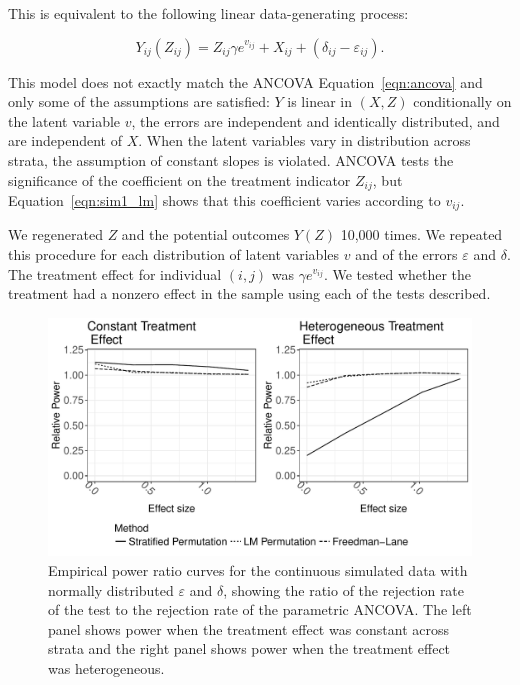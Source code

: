 \documentclass[12pt]{article}
\begin{document}
\noindent This is equivalent to the following linear data-generating process:

\begin{equation}\label{eqn:sim1_lm}
Y_{ij}(Z_{ij}) = Z_{ij} \gamma e^{v_{ij}} + X_{ij} + (\delta_{ij} - \varepsilon_{ij}).
\end{equation}

\noindent This model does not exactly match the ANCOVA Equation~\ref{eqn:ancova} and only some of the assumptions are satisfied:
$Y$ is linear in $(X, Z)$ conditionally on the latent variable $v$, 
the errors are independent and identically distributed, and are independent of $X$.
When the latent variables vary in distribution across strata, the assumption of constant slopes is violated.
ANCOVA tests the significance of the coefficient on the treatment indicator $Z_{ij}$, but Equation~\ref{eqn:sim1_lm}
shows that this coefficient varies according to $v_{ij}$.


We regenerated $Z$ and the potential outcomes $Y(Z)$ 10,000 times.
We repeated this procedure for each distribution of latent variables $v$ and of the errors $\varepsilon$ and $\delta$.
The treatment effect for individual $(i, j)$ was $\gamma e^{v_{ij}}$.
We tested whether the treatment had a nonzero effect in the sample using each of the tests described.

\begin{figure}[h]
\centering
\includegraphics[width = \textwidth]{fig/continuous_outcomes_simulation_power.pdf}
\caption{Empirical power ratio curves for the continuous simulated data with normally distributed $\varepsilon$ and $\delta$, showing the ratio of the rejection rate of the test to the rejection rate of the parametric ANCOVA. The left panel shows power when the treatment effect was constant across strata and the right panel shows power when the treatment effect was heterogeneous.}
\label{fig:continuous_outcomes_sim_power}
\end{figure}
\end{document}
